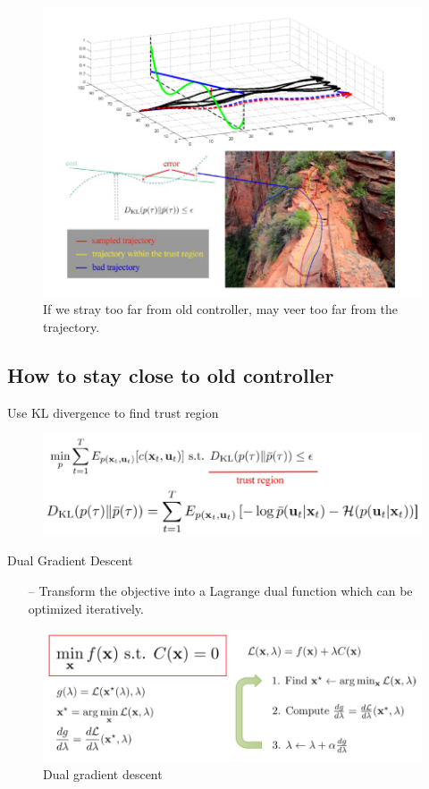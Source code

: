 \documentclass{article}
\begin{document}
\begin{figure}[h]
    \centering
        \includegraphics[width=1\linewidth]{img/traj.png}
    \caption{If we stray too far from old controller, may veer too far from the trajectory.}
    \label{fig:traj}
\end{figure}

\subsection{How to stay close to old controller}
Use KL divergence to find trust region
\begin{figure}[h]
    \centering
        \includegraphics[width=0.8\linewidth]{img/trust.png}
    \label{fig:trust}
\end{figure}

Dual Gradient Descent
\begin{itemize}
\item[--] Transform the objective into a Lagrange dual function which can be optimized iteratively.
\end{itemize}
\begin{figure}[h]
    \centering
        \includegraphics[width=0.8\linewidth]{img/dualgrad.png}
    \caption{Dual gradient descent}
    \label{fig:dgrad}
\end{figure}
\end{document}
